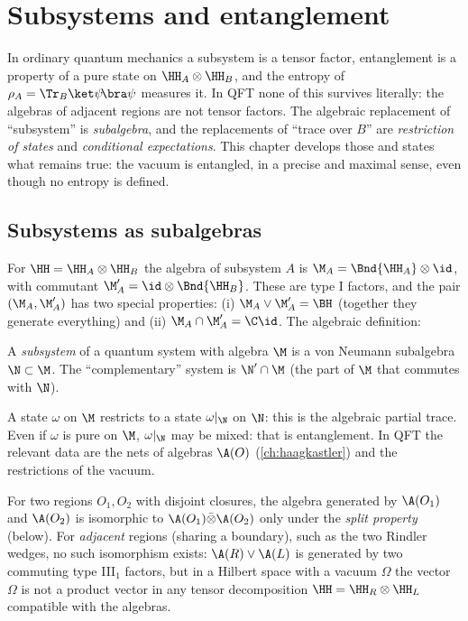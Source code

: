 \chapter{Subsystems and entanglement}\label{ch:subsystems}

\begin{physmotiv}
In ordinary quantum mechanics a subsystem is a tensor factor, entanglement is a property of a pure state on $\HH_A\otimes\HH_B$, and the entropy of $\rho_A=\Tr_B\ket\psi\!\bra\psi$ measures it. In QFT none of this survives literally: the algebras of adjacent regions are not tensor factors. The algebraic replacement of ``subsystem'' is \emph{subalgebra}, and the replacements of ``trace over $B$'' are \emph{restriction of states} and \emph{conditional expectations}. This chapter develops those and states what remains true: the vacuum is entangled, in a precise and maximal sense, even though no entropy is defined.
\end{physmotiv}

\section{Subsystems as subalgebras}

For $\HH=\HH_A\otimes\HH_B$ the algebra of subsystem $A$ is $\M_A=\Bnd{\HH_A}\otimes\id$, with commutant $\M_A'=\id\otimes\Bnd{\HH_B}$. These are type I factors, and the pair $(\M_A,\M_A')$ has two special properties: (i) $\M_A\vee\M_A'=\BH$ (together they generate everything) and (ii) $\M_A\cap\M_A'=\C\id$. The algebraic definition:

\begin{definition}
A \emph{subsystem} of a quantum system with algebra $\M$ is a von Neumann subalgebra $\N\subset\M$. The ``complementary'' system is $\N'\cap\M$ (the part of $\M$ that commutes with $\N$).
\end{definition}

A state $\omega$ on $\M$ restricts to a state $\omega|_\N$ on $\N$: this is the algebraic partial trace. Even if $\omega$ is pure on $\M$, $\omega|_\N$ may be mixed: that is entanglement. In QFT the relevant data are the nets of algebras $\A(O)$ (\cref{ch:haagkastler}) and the restrictions of the vacuum.

\begin{whatwrong}
For two regions $O_1,O_2$ with disjoint closures, the algebra generated by $\A(O_1)$ and $\A(O_2)$ is isomorphic to $\A(O_1)\bar\otimes\A(O_2)$ only under the \emph{split property} (below). For \emph{adjacent} regions (sharing a boundary), such as the two Rindler wedges, no such isomorphism exists: $\A(R)\vee\A(L)$ is generated by two commuting type III$_1$ factors, but in a Hilbert space with a vacuum $\Omega$ the vector $\Omega$ is not a product vector in any tensor decomposition $\HH=\HH_R\otimes\HH_L$ compatible with the algebras.
\end{whatwrong}

